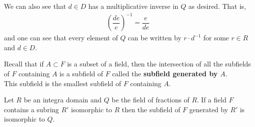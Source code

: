 \documentclass{memoir}
\begin{document}
We can also see that \(d \in D\) has a multiplicative inverse in \(Q\) as desired. That is,
\begin{align*}
	\left( \dfrac{de}{e} \right)^{-1} = \dfrac{e}{de}
\end{align*}
and one can see that every element of \(Q\) can be written by \(r \cdot d^{-1}\) for some \(r \in R\) and \(d \in D\).

\begin{rmrk}
	Recall that if \(A\subset F\) is a subset of a field, then the intersection of all the subfields of \(F\) containing \(A\) is a subfield of \(F\) called the \textbf{subfield generated by \(A\)}.\\

	This subfield is the smallest subfield of \(F\) containing \(A\).
\end{rmrk}

\begin{cor}
	Let \(R\) be an integra domain and \(Q\) be the field of fractions of \(R\). If a field \(F\) contains a subring \(R'\) isomorphic to \(R\) then the subfield of \(F\) generated by \(R'\) is isomorphic to \(Q\).
\end{cor}
\end{document}
